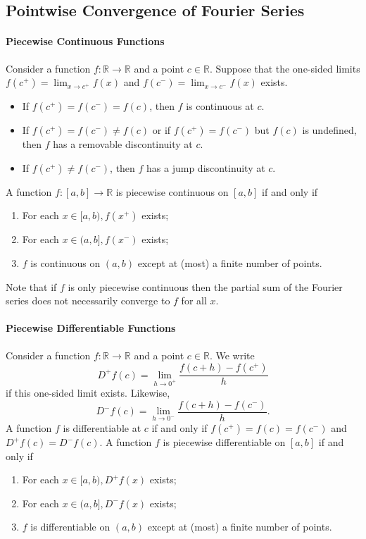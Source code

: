 \subsection{Pointwise Convergence of Fourier Series}

\paragraph{Piecewise Continuous Functions}
Consider a function \(f: \mathbb R \to \mathbb R\) and a point \(c \in \mathbb R\). Suppose that the one-sided limits \(f(c^+) = \lim_{x\to c^+}f(x)\) and \(f(c^-) = \lim_{x\to c^-} f(x)\) exists. 
\begin{itemize}
    \item If \(f(c^+) = f(c^-) = f(c)\), then \(f\) is continuous at \(c\).
    \item If \(f(c^+) = f(c^-) \neq f(c)\) or if \(f(c^+) = f(c^-)\) but \(f(c)\) is undefined, then \(f\) has a removable discontinuity at \(c\).
    \item If \(f(c^+) \neq f(c^-)\), then \(f\) has a jump discontinuity at \(c\).
\end{itemize}
A function \(f:[a,b] \to \mathbb R\) is piecewise continuous on \([a,b]\) if and only if 

\begin{enumerate}[label=(\arabic*)]
    \item For each \(x \in [a,b), f(x^+)\) exists;
    \item For each \(x \in (a,b], f(x^-)\) exists;
    \item \(f\) is continuous on \((a,b)\) except at (most) a finite number of points.
\end{enumerate}
Note that if \(f\) is only piecewise continuous then the partial sum of the Fourier series does not necessarily converge to \(f\) for all \(x\).

\paragraph{Piecewise Differentiable Functions}
Consider a function \(f:\mathbb R \to \mathbb R\) and a point \(c\in\mathbb R\). We write 
\[D^+f(c) = \lim_{h\to 0^+} \frac{f(c+h)-f(c^+)}{h}\]
if this one-sided limit exists. Likewise,
\[D^-f(c) = \lim_{h\to 0^-} \frac{f(c+h)-f(c^-)}{h}.\]
A function \(f\) is  differentiable at \(c\) if and only if \(f(c^+) = f(c) = f(c^-)\) and \(D^+f(c) = D^-f(c)\). A function \(f\) is piecewise differentiable on \([a,b]\) if and only if
\begin{enumerate}[label=(\arabic*)]
    \item For each \(x \in [a,b), D^+f(x)\) exists;
    \item For each \(x \in (a,b], D^-f(x)\) exists;
    \item \(f\) is differentiable on \((a,b)\) except at (most) a finite number of points.
\end{enumerate}

